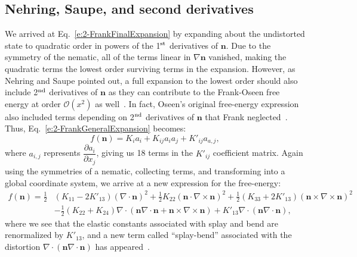 \subsection{Nehring, Saupe, and second derivatives}
We arrived at Eq.~\ref{e:2-FrankFinalExpansion} by expanding about the undistorted state to quadratic order in powers of the 1$^\textup{st}$ derivatives of $\mathbf{n}$.
Due to the symmetry of the nematic, all of the terms linear in $\nabla \mathbf{n}$ vanished, making the quadratic terms the lowest order surviving terms in the expansion.
However, as Nehring and Saupe pointed out, a full expansion to the lowest order should also include 2$^\textup{nd}$ derivatives of $\mathbf{n}$ as they can contribute to the Frank-Oseen free energy at order $\mathcal{O}(x^2)$ as well~\cite{RN60}.
In fact, Oseen's original free-energy expression also included terms depending on 2$^\textup{nd}$ derivatives of $\mathbf{n}$ that Frank neglected~.
Thus, Eq.~\ref{e:2-FrankGeneralExpansion} becomes:
\begin{equation}
  f(\mathbf{n}) = K_i a_i + K_{ij} a_i a_j + K'_{ij} a_{a,j},\label{e:2-NSGeneralExpansion}
\end{equation}
where $a_{i,j}$ represents $\dfrac{\partial a_i}{\partial x_j}$, giving us 18 terms in the $K'_{ij}$ coefficient matrix.
Again using the symmetries of a nematic, collecting terms, and transforming into a global coordinate system, we arrive at a new expression for the free-energy:
\begin{align}
  f(\mathbf{n}) = \frac{1}{2}&(K_{11} - 2K'_{13}) (\nabla \cdot \mathbf{n})^2 + \frac{1}{2}K_{22} (\mathbf{n} \cdot \nabla \times \mathbf{n})^2 + \frac{1}{2}(K_{33} + 2K'_{13}) (\mathbf{n} \times \nabla \times \mathbf{n})^2 \nonumber \\
    & - \frac{1}{2}(K_{22} + K_{24}) \nabla \cdot (\mathbf{n}\nabla \cdot \mathbf{n} + \mathbf{n} \times \nabla \times \mathbf{n})
      + K'_{13} \nabla \cdot (\mathbf{n} \nabla \cdot \mathbf{n}),\label{e:2-NSFinalExpansion}
\end{align}
where we see that the elastic constants associated with splay and bend are renormalized by $K'_{13}$, and a new term called ``splay-bend'' associated with the distortion $\nabla \cdot (\mathbf{n} \nabla \cdot \mathbf{n})$ has appeared~\cite{RN60}. \\

